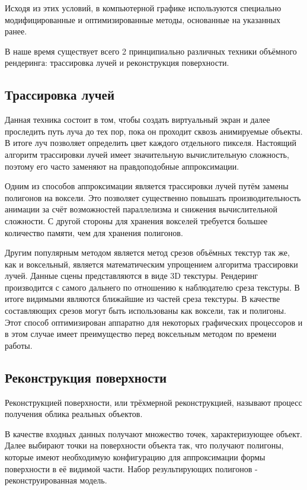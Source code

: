 Исходя из этих условий, в компьютерной графике используются специально модифицированные
и оптимизированные методы, основанные на указанных ранее.

В наше время существует всего 2 принципиально различных техники объёмного рендеринга:
трассировка лучей и реконструкция поверхности.

\subsection{Трассировка лучей}

Данная техника состоит в том, чтобы создать виртуальный экран и далее проследить
путь луча до тех пор, пока он проходит сквозь анимируемые объекты. В итоге луч
позволяет определить цвет каждого отдельного пикселя. Настоящий алгоритм трассировки лучей
имеет значительную вычислительную сложность, поэтому его часто заменяют на
правдоподобные аппроксимации.

Одним из способов аппроксимации является трассировки лучей путём
замены полигонов на воксели. Это позволяет существенно повышать производительность
анимации за счёт возможностей параллелизма и снижения вычислительной сложности.
С другой стороны для хранения вокселей требуется большее количество
памяти, чем для хранения полигонов.

Другим популярным методом является метод срезов объёмных текстур так же, как и воксельный, является математическим упрощением алгоритма трассировки лучей.
Данные сцены представляются в виде 3D текстуры. Рендеринг производится с самого дальнего
 по отношению к наблюдателю среза текстуры. В итоге видимыми являются ближайшие из частей
 среза текстуры.
 В качестве составляющих срезов могут быть использованы как воксели, так и полигоны.
 Этот способ оптимизирован аппаратно для некоторых графических процессоров
 и в этом случае имеет преимущество перед воксельным методом по времени работы.

\subsection{Реконструкция поверхности}

Реконструкцией поверхности, или трёхмерной реконструкцией, называют процесс
получения облика реальных объектов.

В качестве входных данных получают множество точек, характеризующее объект.
Далее выбирают точки на поверхности объекта так, что получают полигоны, которые
имеют необходимую конфигурацию для аппроксимации формы поверхности в её видимой части.
Набор результирующих полигонов - реконструированная модель.

